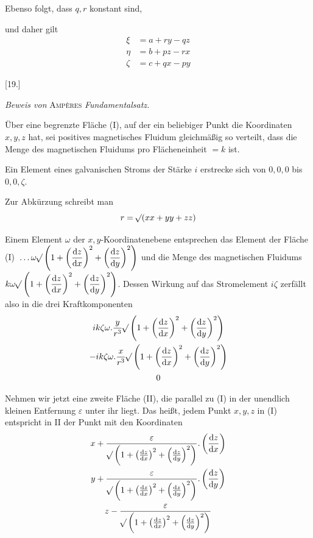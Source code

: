 Ebenso folgt, dass $q,r$ konstant sind,

und daher gilt
\[
\begin{aligned}
\xi&=a+ry-qz\\
\eta&=b+pz-rx\\
\zeta&=c+qx-py
\end{aligned}
\]

\begin{center}[19.]\par\medskip\textit{Beweis von} \textsc{Ampères} \textit{Fundamentalsatz.}\end{center}
Über eine begrenzte Fläche (I), auf der ein beliebiger Punkt die Koordinaten $x,y,z$ hat, sei positives magnetisches Fluidum gleichmäßig so verteilt, dass die Menge des magnetischen Fluidums pro Flächeneinheit $=k$ ist.

Ein Element eines galvanischen Stroms der Stärke $i$ erstrecke sich von $0,0,0$ bis $0,0,\zeta$.

Zur Abkürzung schreibt man
\[
r=\mathord{{}^{}\!\surd}(xx+yy+zz)
\]

Einem Element $\omega$ der $x,y$-Koordinatenebene entsprechen das Element der Fläche (I) $\, .\, .\, .\,\omega\mathord{{}^{}\!\surd}\left(1+\left(\dfrac{\mathrm dz}{\mathrm dx}\right)^2+\left(\dfrac{\mathrm dz}{\mathrm dy}\right)^2\right)$ und die Menge des magnetischen Fluidums $k\omega\mathord{{}^{}\!\surd}\left(1+\left(\dfrac{\mathrm dz}{\mathrm dx}\right)^2+\left(\dfrac{\mathrm dz}{\mathrm dy}\right)^2\right)$. Dessen Wirkung auf das Stromelement $i\zeta$ zerfällt also in die drei Kraftkomponenten
\[
\begin{gathered}
ik\zeta\omega.\frac{y}{r^3}\mathord{{}^{}\!\surd}\left(1+\left(\frac{\mathrm dz}{\mathrm dx}\right)^2+\left(\frac{\mathrm dz}{\mathrm dy}\right)^2\right)\\
-ik\zeta\omega.\frac{x}{r^3}\mathord{{}^{}\!\surd}\left(1+\left(\frac{\mathrm dz}{\mathrm dx}\right)^2+\left(\frac{\mathrm dz}{\mathrm dy}\right)^2\right)\\
0
\end{gathered}
\]

Nehmen wir jetzt eine zweite Fläche (II), die parallel zu (I) in der unendlich kleinen Entfernung $\varepsilon$ unter ihr liegt. Das heißt, jedem Punkt $x,y,z$ in (I) entspricht in II der Punkt mit den Koordinaten
\[
\begin{gathered}
x+\frac{\varepsilon}{\mathord{{}^{}\!\surd}\left(1+\left(\frac{\mathrm dz}{\mathrm dx}\right)^2+\left(\frac{\mathrm dz}{\mathrm dy}\right)^2\right)}.\left(\frac{\mathrm dz}{\mathrm dx}\right)\\
y+\frac{\varepsilon}{\mathord{{}^{}\!\surd}\left(1+\left(\frac{\mathrm dz}{\mathrm dx}\right)^2+\left(\frac{\mathrm dz}{\mathrm dy}\right)^2\right)}.\left(\frac{\mathrm dz}{\mathrm dy}\right)\\
z-\frac{\varepsilon}{\mathord{{}^{}\!\surd}\left(1+\left(\frac{\mathrm dz}{\mathrm dx}\right)^2+\left(\frac{\mathrm dz}{\mathrm dy}\right)^2\right)}
\end{gathered}
\]

